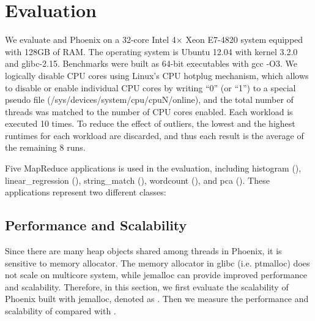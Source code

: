 \section{Evaluation}
\label{sec:eval}
We evaluate \myds and Phoenix on a 32-core Intel 4× Xeon E7-4820 system equipped with 128GB of RAM. 
The operating system is Ubuntu 12.04 with kernel 3.2.0 and glibc-2.15.
Benchmarks were built as 64-bit executables with gcc -O3.
We logically disable CPU cores using Linux’s CPU hotplug mechanism, which allows to disable or enable individual CPU cores by writing “0” (or “1”) to a special pseudo file (/sys/devices/system/cpu/cpuN/online), and the total number of threads was matched to the number of CPU cores enabled.
Each workload is executed 10 times. 
To reduce the effect of outliers, the lowest and the highest runtimes for each workload are discarded, and thus each result is the average of the remaining 8 runs.


Five MapReduce applications is used in the evaluation, including histogram (), linear\_regression (), string\_match (), wordcount (), and pca ().
These applications represent two different classes:


\subsection{Performance and Scalability}
Since there are many heap objects shared among threads in Phoenix, it is sensitive to memory allocator\cite{yoo2009phoenix2}.
The memory allocator in glibc (i.e. ptmalloc\cite{gloger1997ptmalloc}) does not scale on multicore system, while jemalloc\cite{evans2006jemalloc} can provide improved performance and scalability. 
Therefore, in this section, we first evaluate the scalability of Phoenix built with jemalloc, denoted as .
Then we measure the performance and scalability of \myds compared with .


